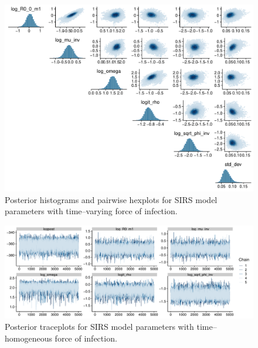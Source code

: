 \begin{figure}[htbp]
	\centering
	\includegraphics[width=\linewidth]{figures/sinfoi_rw1_pairs}
	\caption{Posterior histograms and pairwise hexplots for SIRS model parameters with time--varying force of infection.}
	\label{fig:sinfoirw1pairs}
\end{figure}

\begin{figure}[htbp]
	\centering
	\includegraphics[width=\linewidth]{figures/sinfoi_const_traces}
	\caption{Posterior traceplots for SIRS model parameters with time--homogeneous force of infection.}
	\label{fig:sinfoiconsttraces}
\end{figure}

